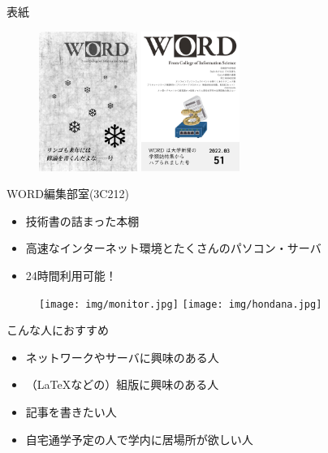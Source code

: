 \documentclass[lualatex]{beamer}
\begin{document}
\begin{frame}[plain]{表紙}
 \begin{figure}
  \centering
  \includegraphics[width=32mm]{img/word49.jpg}
  \includegraphics[width=32mm]{img/word51.jpg}
 \end{figure}
\end{frame}
\begin{frame}[plain]{WORD編集部室(3C212)}
 \begin{itemize}
  \item 技術書の詰まった本棚
  \item 高速なインターネット環境とたくさんのパソコン・サーバ
  \item 24時間利用可能！
 \end{itemize}
\begin{figure}
 \centering
 \texttt{[image: img/monitor.jpg]}
 \texttt{[image: img/hondana.jpg]}
\end{figure}
\end{frame}
\begin{frame}[plain]{こんな人におすすめ}
 \begin{itemize}
  \item ネットワークやサーバに興味のある人
  \item （\LaTeX などの）組版に興味のある人
  \item 記事を書きたい人
  \item 自宅通学予定の人で学内に居場所が欲しい人
 \end{itemize}
\end{frame}
\end{document}
